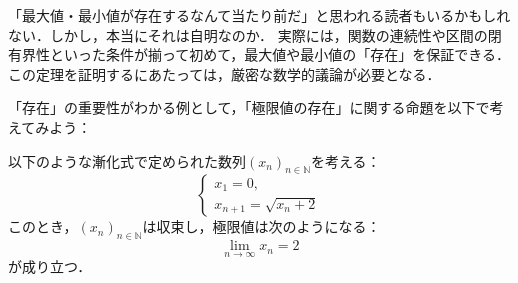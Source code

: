 「最大値・最小値が存在するなんて当たり前だ」と思われる読者もいるかもしれない．しかし，本当にそれは自明なのか．
実際には，関数の連続性や区間の閉有界性といった条件が揃って初めて，最大値や最小値の「存在」を保証できる．この定理を証明するにあたっては，厳密な数学的議論が必要となる．

「存在」の重要性がわかる例として，「極限値の存在」に関する命題を以下で考えてみよう：

\begin{prop}{}{}
  以下のような漸化式で定められた数列$(x_n)_{n \in \mathbb{N}}$を考える：
  \[
    \begin{cases}
      x_1 =0 , \\
      x_{n+1}= \sqrt{x_n+2}
    \end{cases}
  \]
  このとき，$(x_n)_{n \in \mathbb{N}}$は収束し，極限値は次のようになる：
  \[
    \lim_{n \to \infty} x_n =2
  \]
  が成り立つ．
\end{prop}

